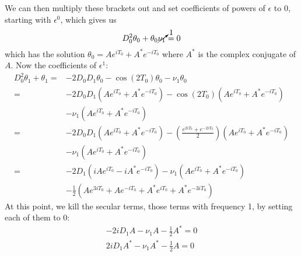 \documentclass[12pt]{article}
\begin{document}
\begin{enumerate}
\begin{enumerate}
            We can then multiply these brackets out and set coefficients of powers of $\epsilon$ to 0, 
            starting with $\epsilon^0$, which gives us
            \begin{equation*}
                D_0^2\theta_0 + \theta_0\cancelto{1}{\nu_1} = 0
            \end{equation*}
            which has the solution $\theta_0 = Ae^{iT_0}+A^*e^{-iT_0}$ where $A^*$ is the 
            complex conjugate of $A$. Now the coefficients of $\epsilon^1$:
            \begin{equation*}
                \begin{split}    
                    D_0^2 \theta_1 +\theta_1 =& -2D_0D_1\theta_0-\cos(2T_0)\theta_0-\nu_1\theta_0 \\
                    =& -2D_0D_1(Ae^{iT_0}+A^*e^{-iT_0})-\cos(2T_0)(Ae^{iT_0}+A^*e^{-iT_0}) \\
                    &-\nu_1(Ae^{iT_0}+A^*e^{-iT_0}) \\
                    =& -2D_0D_1(Ae^{iT_0}+A^*e^{-iT_0})-\left(\frac{e^{2iT_0}+e^{-2iT_0}}{2}\right)(Ae^{iT_0}+A^*e^{-iT_0}) \\
                    &-\nu_1(Ae^{iT_0}+A^*e^{-iT_0}) \\
                    =& -2D_1(iAe^{iT_0}-iA^*e^{-iT_0})-\nu_1(Ae^{iT_0}+A^*e^{-iT_0}) \\
                    &-\frac{1}{2}(Ae^{3iT_0}+Ae^{-iT_0}+A^*e^{iT_0}+A^*e^{-3iT_0})
                \end{split}
            \end{equation*}
            At this point, we kill the secular terms, those terms with frequency 1, by setting each 
            of them to 0:
            \begin{equation}
                \begin{split}
                    -2iD_1A-\nu_1A-\frac{1}{2}A^* = 0 \\
                    2iD_1A^*-\nu_1A^*-\frac{1}{2}A = 0
                \end{split}
                \label{eqn:SecularA}
            \end{equation}


\end{enumerate}
\end{enumerate}
\end{document}
